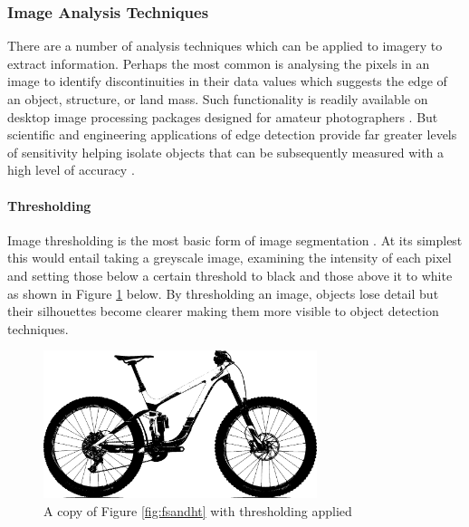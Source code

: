 \subsubsection{Image Analysis Techniques}
	There are a number of analysis techniques which can be applied to imagery to extract information. Perhaps the most common is analysing the pixels in an image to identify discontinuities in their data values which suggests the edge of an object, structure, or land mass. Such functionality is readily available on desktop image processing packages designed for amateur photographers \citep{photoshop}. But scientific and engineering applications of edge detection provide far greater levels of sensitivity helping isolate objects that can be subsequently measured with a high level of accuracy \citep{matlabedge}.
	\paragraph{Thresholding}
		Image thresholding is the most basic form of image segmentation \citep{haralock1991computer}. At its simplest this would entail taking a greyscale image, examining the intensity of each pixel and setting those below a certain threshold to black and those above it to white as shown in Figure \ref{fig:threshold} below. By thresholding an image, objects lose detail but their silhouettes become clearer making them more visible to object detection techniques.
		\begin{figure}[h!]
			\centering
			\includegraphics[width=8cm]{../images/reign_threshold.jpg}
			\caption{A copy of Figure \ref{fig:fsandht} with thresholding applied}
			\label{fig:threshold}
		\end{figure}
